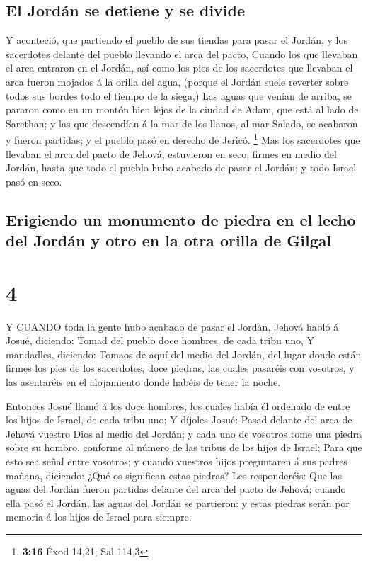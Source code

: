 \hypertarget{el-jorduxe1n-se-detiene-y-se-divide}{%
\subsection{El Jordán se detiene y se
divide}\label{el-jorduxe1n-se-detiene-y-se-divide}}

 Y aconteció, que partiendo el pueblo de sus tiendas para
pasar el Jordán, y los sacerdotes delante del pueblo llevando el arca
del pacto,  Cuando los que llevaban el arca entraron en el
Jordán, así como los pies de los sacerdotes que llevaban el arca fueron
mojados á la orilla del agua, (porque el Jordán suele reverter sobre
todos sus bordes todo el tiempo de la siega,)  Las aguas
que venían de arriba, se pararon como en un montón bien lejos de la
ciudad de Adam, que está al lado de Sarethan; y las que descendían á la
mar de los llanos, al mar Salado, se acabaron y fueron partidas; y el
pueblo pasó en derecho de Jericó. \footnote{\textbf{3:16} Éxod 14,21;
  Sal 114,3}  Mas los sacerdotes que llevaban el arca del
pacto de Jehová, estuvieron en seco, firmes en medio del Jordán, hasta
que todo el pueblo hubo acabado de pasar el Jordán; y todo Israel pasó
en seco.

\hypertarget{erigiendo-un-monumento-de-piedra-en-el-lecho-del-jorduxe1n-y-otro-en-la-otra-orilla-de-gilgal}{%
\subsection{Erigiendo un monumento de piedra en el lecho del Jordán y
otro en la otra orilla de
Gilgal}\label{erigiendo-un-monumento-de-piedra-en-el-lecho-del-jorduxe1n-y-otro-en-la-otra-orilla-de-gilgal}}

\hypertarget{section-3}{%
\section{4}\label{section-3}}

 Y CUANDO toda la gente hubo acabado de pasar el Jordán,
Jehová habló á Josué, diciendo:  Tomad del pueblo doce
hombres, de cada tribu uno,  Y mandadles, diciendo: Tomaos
de aquí del medio del Jordán, del lugar donde están firmes los pies de
los sacerdotes, doce piedras, las cuales pasaréis con vosotros, y las
asentaréis en el alojamiento donde habéis de tener la noche.

 Entonces Josué llamó á los doce hombres, los cuales había
él ordenado de entre los hijos de Israel, de cada tribu uno;
 Y díjoles Josué: Pasad delante del arca de Jehová vuestro
Dios al medio del Jordán; y cada uno de vosotros tome una piedra sobre
su hombro, conforme al número de las tribus de los hijos de Israel;
 Para que esto sea señal entre vosotros; y cuando vuestros
hijos preguntaren á sus padres mañana, diciendo: ¿Qué os significan
estas piedras?  Les responderéis: Que las aguas del Jordán
fueron partidas delante del arca del pacto de Jehová; cuando ella pasó
el Jordán, las aguas del Jordán se partieron: y estas piedras serán por
memoria á los hijos de Israel para siempre.

